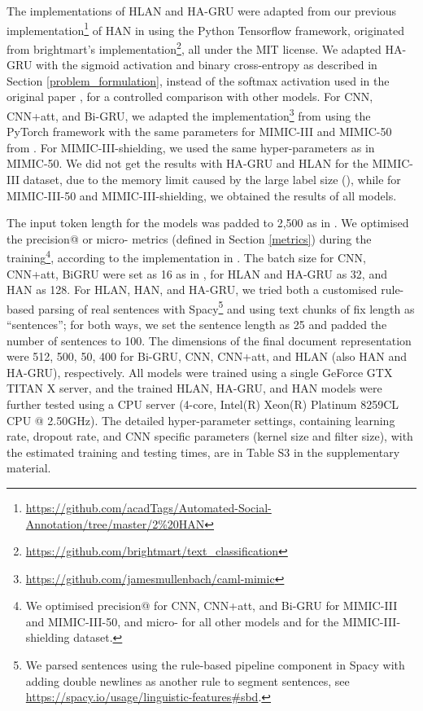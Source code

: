 \documentclass[final,5p,times,twocolumn]{elsarticle}
\begin{document}
The implementations of HLAN and HA-GRU were adapted from our previous implementation\footnote{\url{https://github.com/acadTags/Automated-Social-Annotation/tree/master/2\%20HAN}} of HAN in \cite{dong2020} using the Python Tensorflow \cite{Abadi2016} framework, originated from brightmart's implementation\footnote{\url{https://github.com/brightmart/text_classification}}, all under the MIT license. We adapted HA-GRU with the sigmoid activation and binary cross-entropy as described in Section \ref{problem_formulation}, instead of the softmax activation used in the original paper \cite{baumel2018multi}, for a controlled comparison with other models. For CNN, CNN+att, and Bi-GRU, we adapted the implementation\footnote{\url{https://github.com/jamesmullenbach/caml-mimic}} from \cite{mullenbach-etal-2018-explainable} using the PyTorch framework \cite{NEURIPS2019_9015} with the same parameters for MIMIC-III and MIMIC-50 from \cite{mullenbach-etal-2018-explainable}. For MIMIC-III-shielding, we used the same hyper-parameters as in MIMIC-50. We did not get the results with HA-GRU and HLAN for the MIMIC-III dataset, due to the memory limit caused by the large label size (), while for MIMIC-III-50 and MIMIC-III-shielding, we obtained the results of all models.

The input token length for the models was padded to 2,500 as in \cite{mullenbach-etal-2018-explainable}. We optimised the precision@ or micro- metrics (defined in Section \ref{metrics}) during the training\footnote{We optimised precision@ for CNN, CNN+att, and Bi-GRU for MIMIC-III and MIMIC-III-50, and micro- for all other models and for the MIMIC-III-shielding dataset.}, according to the implementation in \cite{mullenbach-etal-2018-explainable}.  The batch size for CNN, CNN+att, BiGRU were set as 16 as in \cite{mullenbach-etal-2018-explainable}, for HLAN and HA-GRU as 32, and HAN as 128. For HLAN, HAN, and HA-GRU, we tried both a customised rule-based parsing of real sentences with Spacy\footnote{We parsed sentences using the rule-based pipeline component in Spacy with adding double newlines as another rule to segment sentences, see \url{https://spacy.io/usage/linguistic-features\#sbd}.} and using text chunks of fix length as ``sentences''; for both ways, we set the sentence length as 25 and padded the number of sentences to 100. The dimensions of the final document representation were 512, 500, 50, 400 for Bi-GRU, CNN, CNN+att, and HLAN (also HAN and HA-GRU), respectively. All models were trained using a single GeForce GTX TITAN X server, and the trained HLAN, HA-GRU, and HAN models were further tested using a CPU server (4-core, Intel(R) Xeon(R) Platinum 8259CL CPU @ 2.50GHz). The detailed hyper-parameter settings, containing learning rate, dropout rate, and CNN specific parameters (kernel size and filter size), with the estimated training and testing times, are in Table S3 in the supplementary material.
\end{document}

